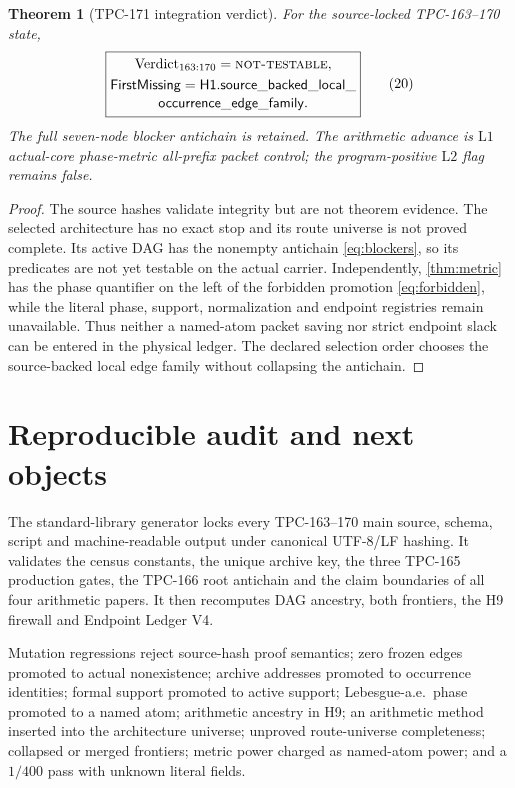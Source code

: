 \documentclass[11pt]{article}
\newtheorem{theorem}{Theorem}[section]
\theoremstyle{definition}
\theoremstyle{remark}
\newcommand{\Lone}{\mathrm{L1}}
\newcommand{\Ltwo}{\mathrm{L2}}
\newcommand{\NT}{\textnormal{\textsc{not-testable}}}
\begin{document}
\begin{theorem}[TPC-171 integration verdict]
\label{thm:verdict}
For the source-locked TPC-163--170 state,
\[
 \boxed{
 \begin{gathered}
 \operatorname{Verdict}_{163:170}=\NT,\\
 \mathsf{FirstMissing}
 =\mathsf{H1.source\_backed\_local\_}\\[-2pt]
 \mathsf{occurrence\_edge\_family}.
 \end{gathered}
 }
\tag{20}\label{eq:verdict}
\]
The full seven-node blocker antichain is retained.  The arithmetic
advance is
\(\Lone\) actual-core phase-metric all-prefix packet control; the
program-positive \(\Ltwo\) flag remains false.
\end{theorem}

\begin{proof}
The source hashes validate integrity but are not theorem evidence.
The selected architecture has no exact stop and its route universe is
not proved complete.  Its active DAG has the nonempty antichain
\eqref{eq:blockers}, so its predicates are not yet testable on the
actual carrier.  Independently, \cref{thm:metric} has the phase
quantifier on the left of the forbidden promotion
\eqref{eq:forbidden}, while the literal phase, support,
normalization and endpoint registries remain unavailable.  Thus
neither a named-atom packet saving nor strict endpoint slack can be
entered in the physical ledger.  The declared selection order chooses
the source-backed local edge family without collapsing the antichain.
\end{proof}

\section{Reproducible audit and next objects}

The standard-library generator locks every TPC-163--170 main source,
schema, script and machine-readable output under canonical UTF-8/LF
hashing.  It validates the census constants, the unique archive key,
the three TPC-165 production gates, the TPC-166 root antichain and the
claim boundaries of all four arithmetic papers.  It then recomputes
DAG ancestry, both frontiers, the H9 firewall and Endpoint Ledger V4.

Mutation regressions reject source-hash proof semantics; zero frozen
edges promoted to actual nonexistence; archive addresses promoted to
occurrence identities; formal support promoted to active support;
Lebesgue-a.e.\ phase promoted to a named atom; arithmetic ancestry in
H9; an arithmetic method inserted into the architecture universe;
unproved route-universe completeness; collapsed or merged frontiers;
metric power charged as named-atom power; and a \(1/400\) pass with
unknown literal fields.
\end{document}
